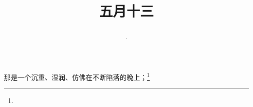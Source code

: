 \title{\date[d=18,m=6,y=2024][year:cn-y,年,month:cn,day:cn,日,·,weekday]·五月十三 }
那是一个沉重、湿润、仿佛在不断陷落的晚上；\footnote{ }

